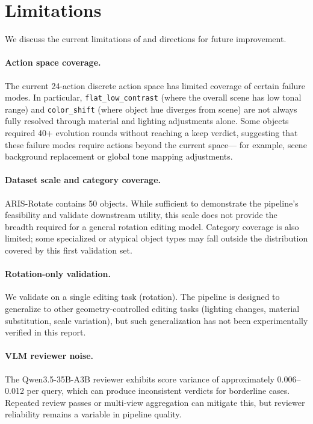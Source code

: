 \section{Limitations}
\label{sec:limitations}

We discuss the current limitations of \aris{} and directions for future improvement.

\paragraph{Action space coverage.}
The current 24-action discrete action space has limited coverage of certain failure modes.
In particular, \texttt{flat\_low\_contrast} (where the overall scene has low tonal range)
and \texttt{color\_shift} (where object hue diverges from scene) are not always fully resolved
through material and lighting adjustments alone.
Some objects required 40+ evolution rounds without reaching a keep verdict,
suggesting that these failure modes require actions beyond the current space---
for example, scene background replacement or global tone mapping adjustments.

\paragraph{Dataset scale and category coverage.}
ARIS-Rotate contains 50 objects.
While sufficient to demonstrate the pipeline's feasibility and validate downstream utility,
this scale does not provide the breadth required for a general rotation editing model.
Category coverage is also limited; some specialized or atypical object types
may fall outside the distribution covered by this first validation set.

\paragraph{Rotation-only validation.}
We validate \aris{} on a single editing task (rotation).
The pipeline is designed to generalize to other geometry-controlled editing tasks
(lighting changes, material substitution, scale variation),
but such generalization has not been experimentally verified in this report.

\paragraph{VLM reviewer noise.}
The Qwen3.5-35B-A3B reviewer exhibits score variance of approximately 0.006--0.012 per query,
which can produce inconsistent verdicts for borderline cases.
Repeated review passes or multi-view aggregation can mitigate this,
but reviewer reliability remains a variable in pipeline quality.

